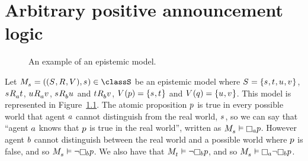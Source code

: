 \chapter{Arbitrary positive announcement logic}\label{papal}

\begin{example}\label{example-el}
\begin{figure}
    \caption{An example of an epistemic model.}\label{example-epistemic-model}
    \centering
\end{figure}

Let $\kPModelAndTuple{\kStateS} \in \classS$ be an epistemic model where $\kStates = \{\kStateS, \kStateT, \kStateU, \kStateV\}$, $\kStateS \kAccessibility{\agentA} \kStateT$, $\kStateU \kAccessibility{\agentA} \kStateV$, $\kStateS \kAccessibility{\agentB} \kStateU$ and $\kStateT \kAccessibility{\agentB} \kStateV$, $\kValuation(\atomP) = \{\kStateS, \kStateT\}$ and $\kValuation(\atomQ) = \{\kStateU, \kStateV\}$.
This model is represented in Figure~\ref{example-epistemic-model}.
The atomic proposition $p$ is true in every possible world that agent $a$ cannot distinguish from the real world, $\kStateS$, so we can say that ``agent $a$ knows that $p$ is true in the real world'', written as $\kPModel{\kStateS} \entails \knows[\agentA] \atomP$.
However agent $b$ cannot distinguish between the real world and a possible world where $p$ is false, and so $\kPModel{\kStateS} \entails \neg \knows[\agentB] \atomP$. We also have that $\kPModel{\kStateT} \entails \neg \knows[\agentB] \atomP$, and so $\kPModel{\kStateS} \entails \knows[\agentA] \neg \knows[\agentB] \atomP$.
\end{example}

